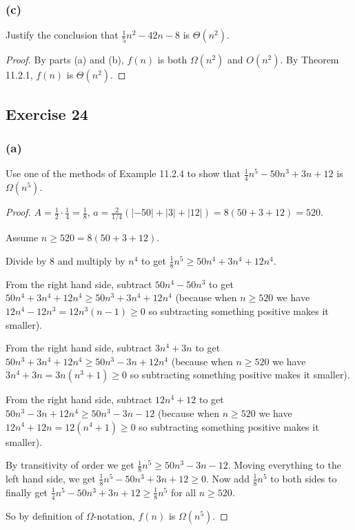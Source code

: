 \documentclass[14pt]{extarticle}
\newcommand{\dps}{\displaystyle}
\begin{document}
\subsubsection{(c)}
Justify the conclusion that \(\frac{1}{5}n^2 - 42n - 8\) is \(\Theta(n^2)\).

\begin{proof}
By parts (a) and (b), \(f(n)\) is both \(\Omega(n^2)\) and \(O(n^2)\). By Theorem 11.2.1, \(f(n)\) is \(\Theta(n^2)\).
\end{proof}

\subsection{Exercise 24}
\subsubsection{(a)}
Use one of the methods of Example 11.2.4 to show that \(\frac{1}{4}n^5 - 50n^3 + 3n + 12\) is \(\Omega(n^5)\).

\begin{proof}
\(A = \frac{1}{2} \cdot \frac{1}{4} = \frac{1}{8}\), \(\dps a = \frac{2}{1/4}(|-50| + |3| + |12|) = 8(50 + 3 + 12)= 520\).

Assume \(n \geq 520 = 8(50+3+12)\). 

Divide by 8 and multiply by \(n^4\) to get \(\dps \frac{1}{8}n^5 \geq 50n^4 + 3n^4 + 12n^4\). 

From the right hand side, subtract \(50n^4 - 50n^3\) to get \(50n^4 + 3n^4 + 12n^4 \geq 50n^3 + 3n^4 + 12n^4\) (because
when \(n \geq 520\) we have \(12n^4 - 12n^3 = 12n^3(n-1) \geq 0\) so subtracting something positive makes it smaller).

From the right hand side, subtract \(3n^4 + 3n\) to get \(50n^3 + 3n^4 + 12n^4 \geq 50n^3 - 3n + 12n^4\) (because
when \(n \geq 520\) we have \(3n^4 + 3n = 3n(n^3+1) \geq 0\) so subtracting something positive makes it smaller).

From the right hand side, subtract \(12n^4 + 12\) to get \(50n^3 - 3n + 12n^4 \geq 50n^3 - 3n - 12\) (because when 
\(n \geq 520\) we have \(12n^4 + 12n = 12(n^4+1) \geq 0\) so subtracting something positive makes it smaller).

By transitivity of order we get \(\dps \frac{1}{8}n^5 \geq 50n^3 - 3n - 12\). Moving everything to the left hand side, we
get \(\dps \frac{1}{8}n^5 - 50n^3 + 3n + 12 \geq 0\). Now add \(\dps \frac{1}{8}n^5\) to both sides to finally get
\(\dps \frac{1}{4}n^5 - 50n^3 + 3n + 12 \geq \frac{1}{8}n^5\) for all \(n \geq 520\).

So by definition of \(\Omega\)-notation, \(f(n)\) is \(\Omega(n^5)\).
\end{proof}
\end{document}
